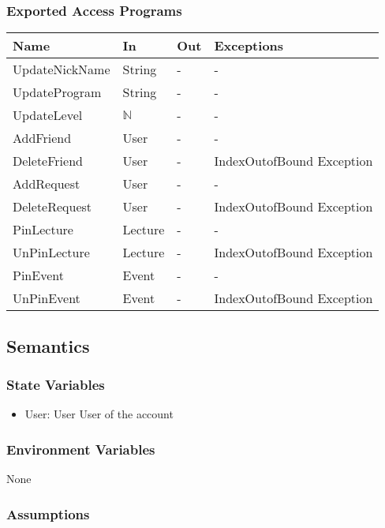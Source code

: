 \documentclass[12pt, titlepage]{article}
\begin{document}
\subsubsection{Exported Access Programs}
\begin{center}
\begin{tabular}{p{4cm} p{2cm} p{4cm} p{4cm}}
\hline
\textbf{Name} & \textbf{In} & \textbf{Out} & \textbf{Exceptions} \\
\hline
UpdateNickName & String & - & -\\
UpdateProgram & String & - & -\\
UpdateLevel & $\mathbb{N}$ & - & -\\
AddFriend & User & - & -\\
DeleteFriend & User & - & IndexOutofBound Exception\\
AddRequest & User & - & -\\
DeleteRequest & User & - & IndexOutofBound Exception\\
PinLecture & Lecture & - & -\\
UnPinLecture & Lecture & - & IndexOutofBound Exception\\
PinEvent & Event & - & -\\
UnPinEvent & Event & - & IndexOutofBound Exception\\
\hline
\end{tabular}
\end{center}

\subsection{Semantics}

\subsubsection{State Variables}

\begin{itemize}
\item User: User
User of the account
\end{itemize}

\subsubsection{Environment Variables}

None

\subsubsection{Assumptions}
\end{document}
